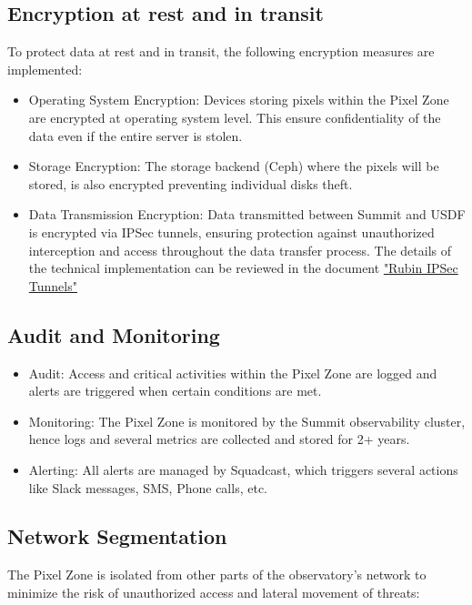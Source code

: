 \subsection{Encryption at rest and in transit}
To protect data at rest and in transit, the following encryption measures are implemented:

\begin{itemize}
    \item Operating System Encryption: Devices storing pixels within the Pixel Zone are encrypted at operating system level. This ensure confidentiality of the data even if the entire server is stolen.
    \item Storage Encryption: The storage backend (Ceph) where the pixels will be stored, is also encrypted preventing individual disks theft.
    \item Data Transmission Encryption: Data transmitted between Summit and USDF is encrypted via IPSec tunnels, ensuring protection against unauthorized interception and access throughout the data transfer process. The details of the technical implementation can be reviewed in the document \href{http://ittn-076.lsst.io}{"Rubin IPSec Tunnels"}
\end{itemize}

\subsection{Audit and Monitoring}

\begin{itemize}
    \item Audit: Access and critical activities within the Pixel Zone are logged and alerts are triggered when certain conditions are met.
    \item Monitoring: The Pixel Zone is monitored by the Summit observability cluster, hence logs and several metrics are collected and stored for 2+ years.
    \item Alerting: All alerts are managed by Squadcast, which triggers several actions like Slack messages, SMS, Phone calls, etc. 
    
\end{itemize}

\subsection{Network Segmentation}
The Pixel Zone is isolated from other parts of the observatory's network to minimize the risk of unauthorized access and lateral movement of threats:

